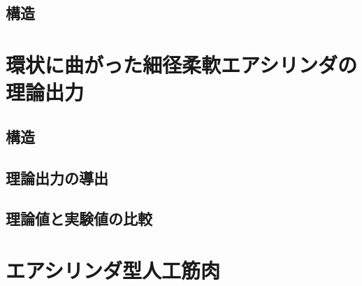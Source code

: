 \subsection{構造}%


\section{環状に曲がった細径柔軟エアシリンダの理論出力}%
\subsection{構造}%

\subsection{理論出力の導出}%

\subsection{理論値と実験値の比較}%


\section{エアシリンダ型人工筋肉}
